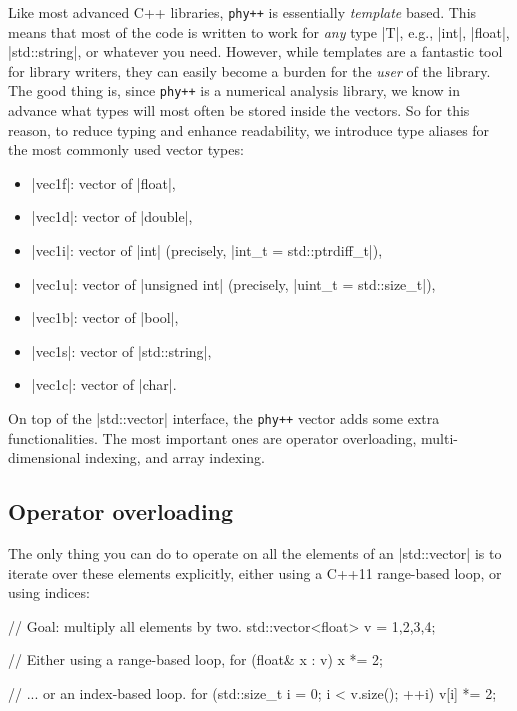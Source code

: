\documentclass[12pt]{report}
\newcommand{\phypp}{\texttt{phy++}\xspace}
\newcommand{\stdvec}{\cppinline|std::vector|\xspace}
\begin{document}
Like most advanced C++ libraries, \phypp is essentially \emph{template} based. This means that most of the code is written to work for \emph{any} type \cppinline|T|, e.g., \cppinline|int|, \cppinline|float|, \cppinline|std::string|, or whatever you need. However, while templates are a fantastic tool for library writers, they can easily become a burden for the \emph{user} of the library. The good thing is, since \phypp is a numerical analysis library, we know in advance what types will most often be stored inside the vectors. So for this reason, to reduce typing and enhance readability, we introduce type aliases for the most commonly used vector types:
\begin{itemize}
\item \cppinline|vec1f|: vector of \cppinline|float|,
\item \cppinline|vec1d|: vector of \cppinline|double|,
\item \cppinline|vec1i|: vector of \cppinline|int| (precisely, \cppinline|int_t = std::ptrdiff_t|),
\item \cppinline|vec1u|: vector of \cppinline|unsigned int| (precisely, \cppinline|uint_t = std::size_t|),
\item \cppinline|vec1b|: vector of \cppinline|bool|,
\item \cppinline|vec1s|: vector of \cppinline|std::string|,
\item \cppinline|vec1c|: vector of \cppinline|char|.
\end{itemize}

On top of the \stdvec interface, the \phypp vector adds some extra functionalities. The most important ones are operator overloading, multi-dimensional indexing, and array indexing.

\subsection{Operator overloading \label{SEC:core:overview:overloading}}

The only thing you can do to operate on all the elements of an \stdvec is to iterate over these elements explicitly, either using a C++11 range-based loop, or using indices:
\begin{cppcode}
// Goal: multiply all elements by two.
std::vector<float> v = {1,2,3,4};

// Either using a range-based loop,
for (float& x : v) {
    x *= 2;
}

// ... or an index-based loop.
for (std::size_t i = 0; i < v.size(); ++i) {
    v[i] *= 2;
}
\end{cppcode}
\end{document}

